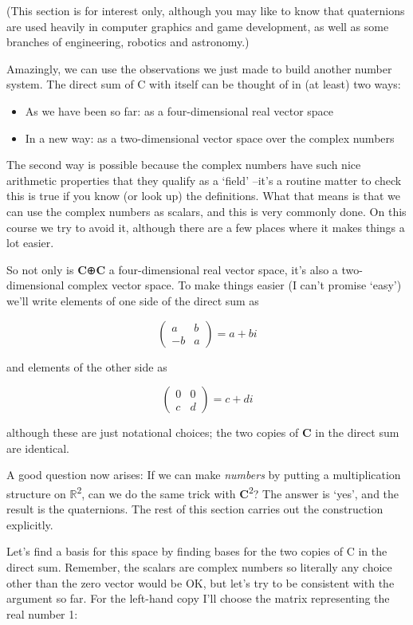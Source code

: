 \documentclass[oneside,english]{amsbook}
\numberwithin{section}{chapter}
\theoremstyle{plain}
\theoremstyle{definition}
\begin{document}
(This section is for interest only, although you may like to know that
quaternions are used heavily in computer graphics and game development,
as well as some branches of engineering, robotics and astronomy.)

Amazingly, we can use the observations we just made to build another
number system. The direct sum of C with itself can be thought of in (at
least) two ways:

\begin{itemize}
	\item
	As we have been so far: as a four-dimensional real vector space
	\item
	In a new way: as a two-dimensional vector space over the complex
	numbers
\end{itemize}

The second way is possible because the complex numbers have such nice
arithmetic properties that they qualify as a `field' --it's a routine
matter to check this is true if you know (or look up) the definitions.
What that means is that we can use the complex numbers as scalars, and
this is very commonly done. On this course we try to avoid it, although
there are a few places where it makes things a lot easier.

So not only is \textbf{C}⊕\textbf{C} a four-dimensional real vector
space, it's also a two-dimensional complex vector space. To make things
easier (I can't promise `easy') we'll write elements of one side of
the direct sum as

\[\begin{pmatrix}
	a & b \\
	- b & a
\end{pmatrix} = a + bi\]

and elements of the other side as

\[\begin{pmatrix}
	0 & 0 \\
	c & d
\end{pmatrix} = c + di\]

although these are just notational choices; the two copies of \textbf{C}
in the direct sum are identical.

A good question now arises: If we can make \emph{numbers} by putting a
multiplication structure on $\mathbb{R}$\textsuperscript{2}, can we do the
same trick with \textbf{C}\textsuperscript{2}? The answer is `yes',
and the result is the quaternions. The rest of this section carries out
the construction explicitly.

Let's find a basis for this space by finding bases for the two copies of
C in the direct sum. Remember, the scalars are complex numbers so
literally any choice other than the zero vector would be OK, but let's
try to be consistent with the argument so far. For the left-hand copy
I'll choose the matrix representing the real number 1:
\end{document}
